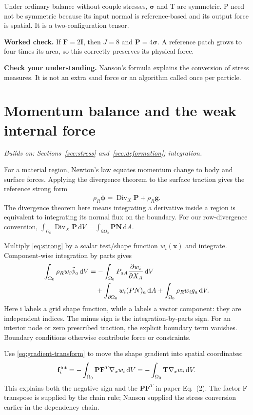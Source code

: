 \documentclass[11pt,a4paper]{article}
\newcommand{\mat}[1]{\mathbf{#1}}
\newcommand{\prereq}[1]{\textit{Builds on: #1}\par}
\newcommand{\checkpoint}[1]{\par\textbf{Check your understanding.} #1\par}
\DeclareMathOperator{\Div}{Div}
\numberwithin{equation}{section}
\begin{document}
Under ordinary balance without couple stresses, $\boldsymbol\sigma$ and T are
symmetric. P need not be symmetric because its input normal is reference-based
and its output force is spatial. It is a two-configuration tensor.

\textbf{Worked check.} If $\mat F=2\mat I$, then $J=8$ and
$\mat P=4\boldsymbol\sigma$. A reference patch grows to four times its area,
so this correctly preserves its physical force.
\checkpoint{Nanson's formula explains the conversion of stress measures. It
is not an extra sand force or an algorithm called once per particle.}

\section{Momentum balance and the weak internal force}\label{sec:weak}
\prereq{Sections~\ref{sec:stress} and~\ref{sec:deformation}; integration.}
For a material region, Newton's law equates momentum change to body and surface
forces. Applying the divergence theorem to the surface traction gives the
reference strong form
\begin{equation}\label{eq:strong}
\rho_R\ddot{\boldsymbol\phi}=\Div_X\mat P+\rho_R\mat g.
\end{equation}
The divergence theorem here means integrating a derivative inside a region is
equivalent to integrating its normal flux on the boundary. For our row-divergence
convention, $\int_{\Omega_0}\Div_X\mat P\,\mathrm dV
=\int_{\partial\Omega_0}\mat P\mat N\,\mathrm dA$.

Multiply \eqref{eq:strong} by a scalar test/shape function $w_i(\mat x)$ and
integrate. Component-wise integration by parts gives
\begin{align}
\int_{\Omega_0}\rho_R w_i\ddot\phi_a\,\mathrm dV
&=-\int_{\Omega_0}P_{aA}\frac{\partial w_i}{\partial X_A}\,\mathrm dV\notag\\
&\quad+\int_{\partial\Omega_0}w_i(PN)_a\,\mathrm dA
+\int_{\Omega_0}\rho_R w_i g_a\,\mathrm dV.\label{eq:weak}
\end{align}
Here i labels a grid shape function, while a labels a vector component: they
are independent indices. The minus sign is the integration-by-parts sign.
For an interior node or zero prescribed traction, the explicit boundary term
vanishes. Boundary conditions otherwise contribute force or constraints.

Use \eqref{eq:gradient-transform} to move the shape gradient into spatial
coordinates:
\begin{equation}\label{eq:internal-integral}
\mat f_i^{\rm int}
=-\int_{\Omega_0}\mat P\mat F^T\nabla_x w_i\,\mathrm dV
=-\int_{\Omega_0}\mat T\nabla_x w_i\,\mathrm dV.
\end{equation}
This explains both the negative sign and the $\mat P\mat F^T$ in paper Eq.~(2).
The factor F transpose is supplied by the chain rule; Nanson supplied the
stress conversion earlier in the dependency chain.
\end{document}
